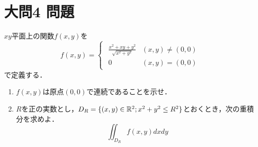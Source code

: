 \documentclass[dvipdfmx]{jsreport}
\begin{document}
\section{大問4 問題}
\begin{tcolorbox} %
	$xy$平面上の関数$f(x, y)$を
\begin{equation*}
	f(x, y)= 
\begin{cases}
\begin{matrix}
	\frac{x^2+ xy+ y^2}{\sqrt{x^2+ y^2}}& (x, y)\ne (0 ,0)\\
	0& (x, y)= (0, 0)
\end{matrix}
\end{cases}
\end{equation*}
	で定義する．
\begin{enumerate}
	\item $f(x, y)$は原点$(0, 0)$で連続であることを示せ．
	\item $R$を正の実数とし，$D_R= \{(x, y)\in \mathbb{R}^2; x^2+ y^2\le R^2\}$とおくとき，次の重積分を求めよ．
\begin{equation*}
	\iint_{D_R} f(x, y) dxdy
\end{equation*}
\end{enumerate}
\end{tcolorbox}
\end{document}
